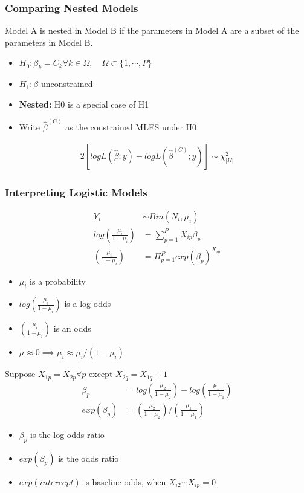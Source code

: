 \documentclass{article}
\theoremstyle{definition}
\theoremstyle{thrm}
\theoremstyle{lma}
\theoremstyle{ppst}
\theoremstyle{crlr}
\begin{document}
\subsubsection{Comparing Nested Models}
Model A is nested in Model B if the parameters in Model A are a subset of the parameters in Model B.
\begin{itemize}
	\item $H_0:\beta_k = C_k \forall k\in\Omega, \quad \Omega \subset \{1,\cdots,P\}$
	\item $H_1:\beta$ unconstrained
	\item \textbf{Nested: }H0 is a special case of H1
	\item Write $\hat{\beta}^{(C)}$ as the constrained MLES under H0
\end{itemize}
\begin{align*}
	2[logL(\hat{\beta};y)-log L(\hat{\beta}^{(C)};y)] \sim \chi_{|\Omega|}^2
\end{align*}

\subsubsection{Interpreting Logistic Models}
\begin{align*}
	Y_i &\sim Bin(N_i, \mu_i)\\
	log(\frac{\mu_i}{1-\mu_i}) &= \sum_{p=1}^PX_{ip}\beta_p\\
	(\frac{\mu_i}{1-\mu_i}) &= \Pi_{p=1}^P exp(\beta_p)^{X_{ip}}
\end{align*}
\begin{itemize}
	\item $\mu_i$ is a probability
	\item $log(\frac{\mu_i}{1-\mu_i})$ is a log-odds
	\item $(\frac{\mu_i}{1-\mu_i})$ is an odds
	\item $\mu \approx 0 \implies \mu_i \approx \mu_i/(1-\mu_i)$
\end{itemize}
Suppose $X_{1p} = X_{2p} \forall p$ except $X_{2q} = X_{1q}+1$
\begin{align*}
	\beta_p &= log(\frac{\mu_2}{1-\mu_2})-log(\frac{\mu_1}{1-\mu_1})\\
	exp(\beta_p) &= (\frac{\mu_2}{1-\mu_2})/(\frac{\mu_1}{1-\mu_1})  
\end{align*}
\begin{itemize}
	\item $\beta_p$ is the log-odds ratio
	\item $exp(\beta_p)$ is the odds ratio
	\item $exp(intercept)$ is baseline odds, when $X_{i2}\cdots X_{ip}=0$
\end{itemize}
\end{document}
